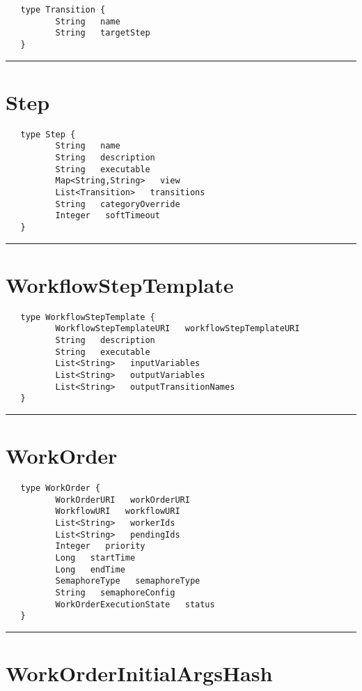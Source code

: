 \begin{verbatim}
   type Transition {
          String   name
          String   targetStep
   }
\end{verbatim}

\rule{15cm}{2pt}
\section{Step}
\label{type:Step}

\begin{verbatim}
   type Step {
          String   name
          String   description
          String   executable
          Map<String,String>   view
          List<Transition>   transitions
          String   categoryOverride
          Integer   softTimeout
   }
\end{verbatim}

\rule{15cm}{2pt}
\section{WorkflowStepTemplate}
\label{type:WorkflowStepTemplate}

\begin{verbatim}
   type WorkflowStepTemplate {
          WorkflowStepTemplateURI   workflowStepTemplateURI
          String   description
          String   executable
          List<String>   inputVariables
          List<String>   outputVariables
          List<String>   outputTransitionNames
   }
\end{verbatim}

\rule{15cm}{2pt}
\section{WorkOrder}
\label{type:WorkOrder}

\begin{verbatim}
   type WorkOrder {
          WorkOrderURI   workOrderURI
          WorkflowURI   workflowURI
          List<String>   workerIds
          List<String>   pendingIds
          Integer   priority
          Long   startTime
          Long   endTime
          SemaphoreType   semaphoreType
          String   semaphoreConfig
          WorkOrderExecutionState   status
   }
\end{verbatim}

\rule{15cm}{2pt}
\section{WorkOrderInitialArgsHash}
\label{type:WorkOrderInitialArgsHash}

